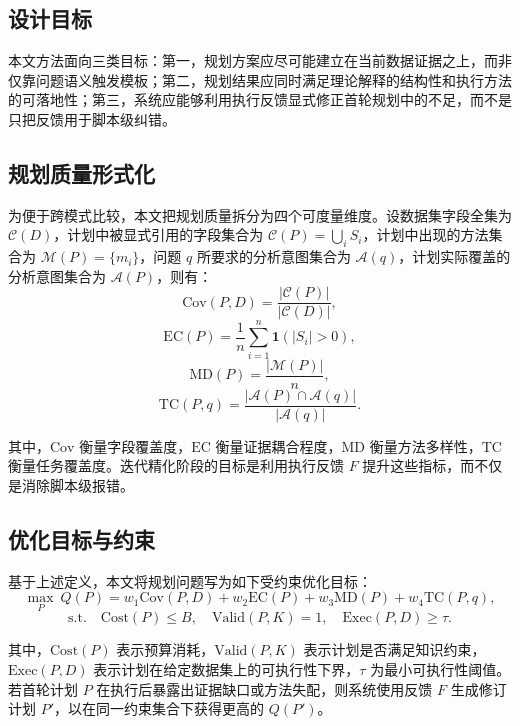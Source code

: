 \subsection{设计目标}

本文方法面向三类目标：第一，规划方案应尽可能建立在当前数据证据之上，而非仅靠问题语义触发模板；第二，规划结果应同时满足理论解释的结构性和执行方法的可落地性；第三，系统应能够利用执行反馈显式修正首轮规划中的不足，而不是只把反馈用于脚本级纠错。

\subsection{规划质量形式化}

为便于跨模式比较，本文把规划质量拆分为四个可度量维度。设数据集字段全集为 $\mathcal{C}(D)$，计划中被显式引用的字段集合为 $\mathcal{C}(P)=\bigcup_i S_i$，计划中出现的方法集合为 $\mathcal{M}(P)=\{m_i\}$，问题 $q$ 所要求的分析意图集合为 $\mathcal{A}(q)$，计划实际覆盖的分析意图集合为 $\mathcal{A}(P)$，则有：
\[
\mathrm{Cov}(P,D)=\frac{|\mathcal{C}(P)|}{|\mathcal{C}(D)|},
\]
\[
\mathrm{EC}(P)=\frac{1}{n}\sum_{i=1}^{n}\mathbf{1}(|S_i|>0),
\]
\[
\mathrm{MD}(P)=\frac{|\mathcal{M}(P)|}{n},
\]
\[
\mathrm{TC}(P,q)=\frac{|\mathcal{A}(P)\cap \mathcal{A}(q)|}{|\mathcal{A}(q)|}.
\]

其中，$\mathrm{Cov}$ 衡量字段覆盖度，$\mathrm{EC}$ 衡量证据耦合程度，$\mathrm{MD}$ 衡量方法多样性，$\mathrm{TC}$ 衡量任务覆盖度。迭代精化阶段的目标是利用执行反馈 $F$ 提升这些指标，而不仅是消除脚本级报错。

\subsection{优化目标与约束}

基于上述定义，本文将规划问题写为如下受约束优化目标：
\[
\max_{P} \ Q(P)=w_1\mathrm{Cov}(P,D)+w_2\mathrm{EC}(P)+w_3\mathrm{MD}(P)+w_4\mathrm{TC}(P,q),
\]
\[
\text{s.t.}\quad \mathrm{Cost}(P)\leq B,\quad \mathrm{Valid}(P,K)=1,\quad \mathrm{Exec}(P,D)\geq \tau .
\]

其中，$\mathrm{Cost}(P)$ 表示预算消耗，$\mathrm{Valid}(P,K)$ 表示计划是否满足知识约束，$\mathrm{Exec}(P,D)$ 表示计划在给定数据集上的可执行性下界，$\tau$ 为最小可执行性阈值。若首轮计划 $P$ 在执行后暴露出证据缺口或方法失配，则系统使用反馈 $F$ 生成修订计划 $P'$，以在同一约束集合下获得更高的 $Q(P')$。
